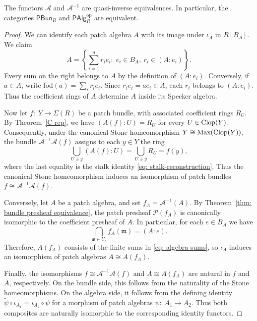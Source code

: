 \documentclass[11pt]{amsart}
\begin{document}
\begin{theorem}\label{cor: PAlg PBundle}
The functors $\mathcal A$ and $\mathcal A^{-1}$ are quasi-inverse equivalences. In particular, the categories $\mathsf{PBun}_R$ and $\mathsf{PAlg}_R^{\mathrm{op}}$ are equivalent.
\end{theorem}
\begin{proof}
We can identify each patch algebra $A$ with its image under $\iota_A$ in $R[B_A]$. We claim  
\begin{equation}\label{eq: algebra sums}
A=\left\{\sum_{i=1}^{n}r_i e_i:
\; e_i\in B_A, \ r_i\in(A:e_i)\right\}.
\tag{*}
\end{equation}
Every sum on the right belongs to $A$ by the definition of $(A:e_i)$. Conversely, if $a\in A$, write fod$(a)=\sum_i r_i e_i$. Since $r_i e_i=ae_i\in A$, each $r_i$ belongs to $(A:e_i)$. Thus the coefficient rings of $A$ determine $A$ inside its Specker algebra.

Now let $f\colon\; Y\to\Sigma(R)$ be a patch bundle, with associated coefficient rings $R_U$. By Theorem~\ref{C rep}, we have
$(A(f):U)=R_U$ for every $U\in\mbox{\rm Clop}(Y)$. Consequently, under the canonical Stone homeomorphism $Y\cong\mbox{\rm Max}(\mbox{\rm Clop}(Y))$, the bundle $\mathcal A^{-1}\mathcal A(f)$ assigns to each $y\in Y$ the ring $$
\bigcup_{U\ni y}(A(f):U) =\bigcup_{U\ni y}R_U
=f(y),$$
where the last equality is the stalk identity \eqref{eq: stalk-reconstruction}. Thus the canonical Stone homeomorphism induces an isomorphism of patch bundles $f\cong\mathcal A^{-1}\mathcal A(f)$.

Conversely, let $A$ be a patch algebra, and set $f_A=\mathcal A^{-1}(A)$. By Theorem~\ref{thm: bundle presheaf equivalence}, the patch presheaf $\mathcal P(f_A)$ is canonically isomorphic to the coefficient presheaf of $A$. In particular, for each $e\in B_A$ we have $$
\bigcap_{\mathfrak m\in U_e}f_A(\mathfrak m)=(A:e).$$ Therefore, $A(f_A)$ consists of the finite sums in \eqref{eq: algebra sums}, so $\iota_A$ induces an isomorphism of patch algebras $A\cong A(f_A)$.

Finally, the isomorphisms $f\cong\mathcal A^{-1}\mathcal A(f)$ and $A\cong A(f_A)$ are natural in $f$ and $A$, respectively. On the bundle side, this follows from the naturality of the Stone homeomorphisms. On the algebra side, it follows from the defining identity $\widetilde\psi\circ\iota_{A_1}
=\iota_{A_2}\circ\psi$ for a morphism of patch algebras $\psi\colon\; A_1\to A_2$. Thus both composites are naturally isomorphic to the corresponding identity functors.
\end{proof}
\end{document}
